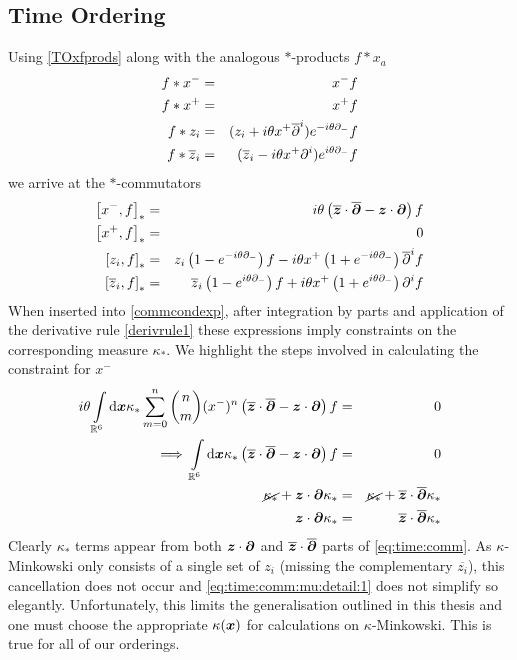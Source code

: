 \subsection{Time Ordering}
\label{TOint}
Using \eqref{TOxfprods} along with the analogous $*$-products $f*x_a$
\begin{eqnarray}
  \label{eq:time:starx}
  f\ast x^- &=&x^-f\\ \nonumber
  f\ast x^+ &=&x^+f\\ \nonumber
  f\ast z_i&=&(z_i+i\theta x^+\overline{\partial}^i)e^{-i\theta\partial_-}f\\ \nonumber
  f\ast \overline{z}_i&=&(\overline{z}_i-i\theta x^+\partial^i)e^{i\theta\partial_-}f
\end{eqnarray}
we arrive at the $*$-commutators
\begin{eqnarray}
  \label{eq:time:comm}
  \left[x^-,f\right]_\ast&=&i \theta \left( \overline{{\boldsymbol {z} }}\cdot\overline{{\boldsymbol {\partial} }}
    -{{\boldsymbol {z} }}\cdot{{\boldsymbol {\partial} }}\right)f   \\ \nonumber
  \left[x^+,f\right]_\ast&=&0   \\ \nonumber
  \left[z_i,f\right]_\ast&=&z_i \left(1
    -e^{-i \theta \partial_-}\right)f-i \theta x^+ \left(1
    +e^{-i \theta \partial_-}\right)\overline{\partial}^{ i}f   \\
  \left[ \overline{z}_i,f\right]_\ast&=&\overline{z}_i \left(1
    -e^{i \theta \partial_-}\right)f+i \theta x^+ \left(1
    +e^{i \theta \partial_-}\right)\partial^if \nonumber
\end{eqnarray}
When inserted into \eqref{commcondexp}, after integration by parts and
application of the derivative rule \eqref{derivrule1} these expressions imply
constraints on the corresponding measure $\kappa_\ast$. We highlight the steps
involved in calculating the constraint for $x^-$
\begin{eqnarray}
  \label{eq:time:comm:mu:detail:1}
  i\theta \int\limits_{{\mathbb R}^6} {\rm d}{\boldsymbol {x} } \kappa_\ast \sum_{m=0}^n {\binom nm}
  (x^-)^n \left( \overline{{\boldsymbol {z} }}\cdot\overline{{\boldsymbol {\partial} }}
    -{{\boldsymbol {z} }}\cdot{{\boldsymbol {\partial} }}\right)f &=&0 \\\nonumber
  \implies \int\limits_{{\mathbb R}^6} {\rm d}{\boldsymbol {x} }
  \kappa_\ast \left( \overline{{\boldsymbol {z} }}\cdot\overline{{\boldsymbol {\partial} }}
    -{{\boldsymbol {z} }}\cdot{{\boldsymbol {\partial} }}\right)f &=&0 \\\nonumber
  \cancel{\kappa_\ast}
  + {{\boldsymbol {z} }}\cdot{{\boldsymbol {\partial} }}\kappa_\ast&=&
  \cancel{\kappa_\ast}
  + \overline{{\boldsymbol {z} }}\cdot\overline{{\boldsymbol {\partial} }}\kappa_\ast
  \\ \nonumber {{\boldsymbol {z} }}\cdot{{\boldsymbol {\partial} }}\kappa_\ast&=&\overline{{\boldsymbol {z} }}\cdot\overline{{\boldsymbol {\partial} }}\kappa_\ast
\end{eqnarray}
Clearly $\kappa_\ast$ terms appear from both ${{\boldsymbol {z} }}\cdot{{\boldsymbol {\partial} }}$ and
$\overline{{\boldsymbol {z} }}\cdot\overline{{\boldsymbol {\partial} }}$ parts of \eqref{eq:time:comm}. As $\kappa$-Minkowski only
consists of a single set of $z_i$ (missing the complementary $\overline{z_i}$),
this cancellation does not occur \cite{Agostini:2004cu} and
\eqref{eq:time:comm:mu:detail:1} does not simplify so elegantly. Unfortunately,
this limits the generalisation outlined in this thesis and one must choose the
appropriate $\kappa({\boldsymbol {x} })$ for calculations on $\kappa$-Minkowski. This is
true for all of our orderings.

